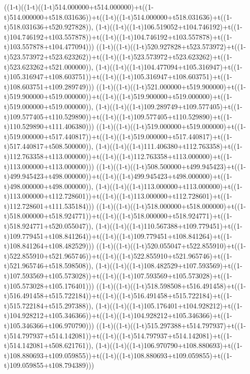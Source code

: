 ((1-t)((1-t)((1-t)514.000000+t514.000000)+t((1-t)514.000000+t518.031636))+t((1-t)((1-t)514.000000+t518.031636)+t((1-t)518.031636+t520.927828)),                                     (1-t)((1-t)((1-t)106.519052+t104.746192)+t((1-t)104.746192+t103.557878))+t((1-t)((1-t)104.746192+t103.557878)+t((1-t)103.557878+t104.477094)))
((1-t)((1-t)((1-t)520.927828+t523.573972)+t((1-t)523.573972+t523.623262))+t((1-t)((1-t)523.573972+t523.623262)+t((1-t)523.623262+t521.000000)),                                     (1-t)((1-t)((1-t)104.477094+t105.316947)+t((1-t)105.316947+t108.603751))+t((1-t)((1-t)105.316947+t108.603751)+t((1-t)108.603751+t109.289749)))
((1-t)((1-t)((1-t)521.000000+t519.900000)+t((1-t)519.900000+t519.000000))+t((1-t)((1-t)519.900000+t519.000000)+t((1-t)519.000000+t519.000000)),                                     (1-t)((1-t)((1-t)109.289749+t109.577405)+t((1-t)109.577405+t110.529890))+t((1-t)((1-t)109.577405+t110.529890)+t((1-t)110.529890+t111.406380)))
((1-t)((1-t)((1-t)519.000000+t519.000000)+t((1-t)519.000000+t517.440817))+t((1-t)((1-t)519.000000+t517.440817)+t((1-t)517.440817+t508.500000)),                                     (1-t)((1-t)((1-t)111.406380+t112.763358)+t((1-t)112.763358+t113.000000))+t((1-t)((1-t)112.763358+t113.000000)+t((1-t)113.000000+t113.000000)))
((1-t)((1-t)((1-t)508.500000+t499.945423)+t((1-t)499.945423+t498.000000))+t((1-t)((1-t)499.945423+t498.000000)+t((1-t)498.000000+t498.000000)),                                     (1-t)((1-t)((1-t)113.000000+t113.000000)+t((1-t)113.000000+t112.728601))+t((1-t)((1-t)113.000000+t112.728601)+t((1-t)112.728601+t111.535184)))
((1-t)((1-t)((1-t)518.000000+t518.000000)+t((1-t)518.000000+t518.924771))+t((1-t)((1-t)518.000000+t518.924771)+t((1-t)518.924771+t520.055047)),                                     (1-t)((1-t)((1-t)110.567388+t109.779451)+t((1-t)109.779451+t108.841264))+t((1-t)((1-t)109.779451+t108.841264)+t((1-t)108.841264+t108.482529)))
((1-t)((1-t)((1-t)520.055047+t522.855910)+t((1-t)522.855910+t521.965746))+t((1-t)((1-t)522.855910+t521.965746)+t((1-t)521.965746+t518.598508)),                                     (1-t)((1-t)((1-t)108.482529+t107.593569)+t((1-t)107.593569+t105.573028))+t((1-t)((1-t)107.593569+t105.573028)+t((1-t)105.573028+t105.176401)))
((1-t)((1-t)((1-t)518.598508+t516.491458)+t((1-t)516.491458+t515.722184))+t((1-t)((1-t)516.491458+t515.722184)+t((1-t)515.722184+t515.297388)),                                     (1-t)((1-t)((1-t)105.176401+t104.928212)+t((1-t)104.928212+t105.346366))+t((1-t)((1-t)104.928212+t105.346366)+t((1-t)105.346366+t106.970790)))
((1-t)((1-t)((1-t)515.297388+t514.797937)+t((1-t)514.797937+t514.142081))+t((1-t)((1-t)514.797937+t514.142081)+t((1-t)514.142081+t508.621761)),                                     (1-t)((1-t)((1-t)106.970790+t108.880693)+t((1-t)108.880693+t109.059855))+t((1-t)((1-t)108.880693+t109.059855)+t((1-t)109.059855+t108.794389)))
